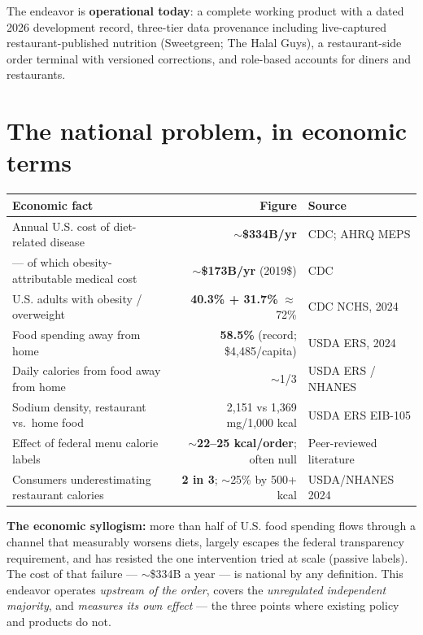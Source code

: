 \documentclass[10pt]{article}
\begin{document}
The endeavor is \textbf{operational today}: a complete working product with a dated 2026 development record,
three-tier data provenance including live-captured restaurant-published nutrition (Sweetgreen; The Halal Guys), a
restaurant-side order terminal with versioned corrections, and role-based accounts for diners and restaurants.

\section{The national problem, in economic terms}

\begin{tabularx}{\textwidth}{@{}L r >{\raggedright\arraybackslash}p{4.2cm}@{}}
\toprule
\textbf{Economic fact} & \textbf{Figure} & \textbf{Source}\\
\midrule
Annual U.S. cost of diet-related disease & \textbf{$\sim$\$334B/yr} & CDC; AHRQ MEPS\\
--- of which obesity-attributable medical cost & \textbf{$\sim$\$173B/yr} (2019\$) & CDC\\
U.S. adults with obesity / overweight & \textbf{40.3\% + 31.7\%} $\approx$ 72\% & CDC NCHS, 2024\\
Food spending away from home & \textbf{58.5\%} (record; \$4,485/capita) & USDA ERS, 2024\\
Daily calories from food away from home & $\sim$1/3 & USDA ERS / NHANES\\
Sodium density, restaurant vs.\ home food & 2,151 vs 1,369 mg/1,000 kcal & USDA ERS EIB-105\\
Effect of federal menu calorie labels & \textbf{$\sim$22--25 kcal/order}; often null & Peer-reviewed literature\\
Consumers underestimating restaurant calories & \textbf{2 in 3}; $\sim$25\% by 500+ kcal & USDA/NHANES 2024\\
\bottomrule
\end{tabularx}

\vspace{4pt}
\textbf{The economic syllogism:} more than half of U.S. food spending flows through a channel that measurably worsens
diets, largely escapes the federal transparency requirement, and has resisted the one intervention tried at scale
(passive labels). The cost of that failure --- $\sim$\$334B a year --- is national by any definition. This endeavor
operates \emph{upstream of the order}, covers the \emph{unregulated independent majority}, and \emph{measures its own
effect} --- the three points where existing policy and products do not.
\end{document}
